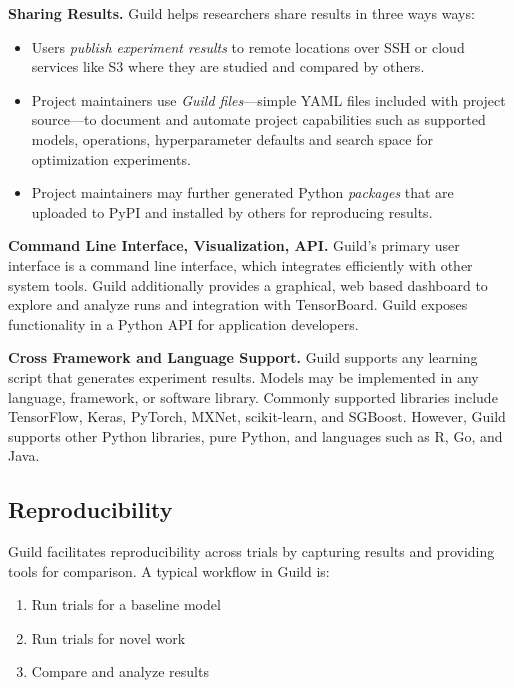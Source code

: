 \documentclass{article}
\begin{document}
\textbf{Sharing Results.} Guild helps researchers share results in
three ways ways:

\begin{itemize}[topsep=0pt, itemsep=0pt]
\item Users \emph{publish experiment results} to remote locations over
  SSH or cloud services like S3 where they are studied and compared by
  others.

\item Project maintainers use \emph{Guild files}---simple YAML files
  included with project source---to document and automate project
  capabilities such as supported models, operations, hyperparameter
  defaults and search space for optimization experiments.

\item Project maintainers may further generated Python \emph{packages}
  that are uploaded to PyPI and installed by others for reproducing
  results.
\end{itemize}

\textbf{Command Line Interface, Visualization, API.} Guild's primary
user interface is a command line interface, which integrates
efficiently with other system tools. Guild additionally provides a
graphical, web based dashboard to explore and analyze runs and
integration with TensorBoard. Guild exposes functionality in a Python
API for application developers.

\textbf{Cross Framework and Language Support.} Guild supports any
learning script that generates experiment results. Models may be
implemented in any language, framework, or software library. Commonly
supported libraries include TensorFlow, Keras, PyTorch, MXNet,
scikit-learn, and SGBoost. However, Guild supports other Python
libraries, pure Python, and languages such as R, Go, and Java.

\subsection{Reproducibility}

Guild facilitates reproducibility across trials by capturing results
and providing tools for comparison. A typical workflow in Guild is:

\begin{enumerate}[noitemsep, topsep=0pt, partopsep=0pt]
\item Run trials for a baseline model
\item Run trials for novel work
\item Compare and analyze results
\end{enumerate}
\end{document}
